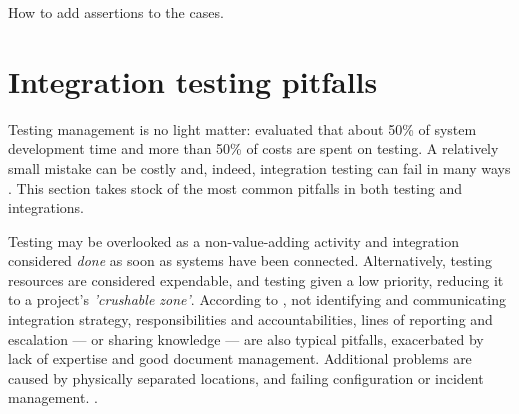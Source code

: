 \documentclass[12pt,a4paper,oneside,pdftex]{report}
\begin{document}
How to add assertions to the cases.

\section{Integration testing pitfalls}
\label{section:pitfalls}


Testing management is no light matter: \citet{reid2005art} evaluated that about 50\% of system development time and more than 50\% of costs are spent on testing. A relatively small mistake can be costly and, indeed, integration testing can fail in many ways \citep{van2008identifying}. This section takes stock of the most common pitfalls in both testing and integrations.

Testing may be overlooked as a non-value-adding activity and integration considered \emph{done} as soon as systems have been connected. Alternatively, testing resources are considered expendable, and testing given a low priority, reducing it to a project's \emph{'crushable zone'}. According to \citet{van2008identifying}, not identifying and communicating integration strategy, responsibilities and accountabilities, lines of reporting and escalation --- or sharing knowledge --- are also typical pitfalls, exacerbated by lack of expertise and good document management. Additional problems are caused by physically separated locations, and failing configuration or incident management. \citep{van2008identifying}.
\end{document}
